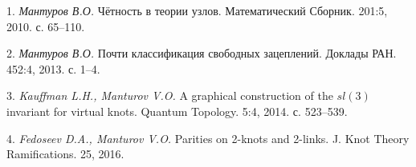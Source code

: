 \litlist

1. {\it Мантуров В.О.} Чётность в теории узлов. Математический Сборник. 201:5, 2010. с. 65--110.

2. {\it Мантуров В.О.} Почти классификация свободных зацеплений. Доклады РАН. 452:4, 2013. с. 1--4.

3. {\it Kauffman L.H., Manturov V.O.} A graphical construction of the $sl(3)$ invariant for virtual knots. Quantum Topology. 5:4, 2014. с. 523--539.

4. {\it Fedoseev D.A., Manturov V.O.} Parities on 2-knots and 2-links. J. Knot Theory Ramifications. 25, 2016.

